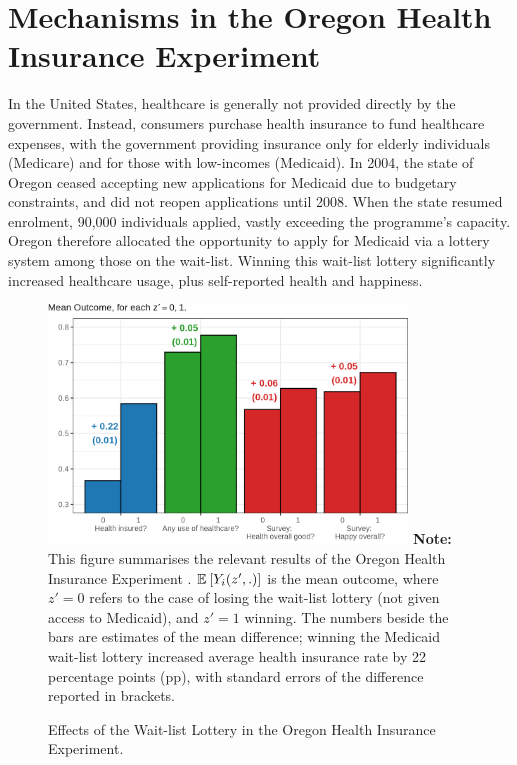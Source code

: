 \section{Mechanisms in the Oregon Health Insurance Experiment}
\label{sec:lottery}
In the United States, healthcare is generally not provided directly by the government.
Instead, consumers purchase health insurance to fund healthcare expenses, with the government providing insurance only for elderly individuals (Medicare) and for those with low-incomes (Medicaid).
In 2004, the state of Oregon ceased accepting new applications for Medicaid due to budgetary constraints, and did not reopen applications until 2008.
When the state resumed enrolment, 90,000 individuals applied, vastly exceeding the programme's capacity.
Oregon therefore allocated the opportunity to apply for Medicaid via a lottery system among those on the wait-list.
Winning this wait-list lottery significantly increased healthcare usage, plus self-reported health and happiness.

\begin{figure}[!htbp]
    \caption{Effects of the Wait-list Lottery in the Oregon Health Insurance Experiment.}
    \centering
    \includegraphics[width=0.85\textwidth]{sections/figures/insurance-effects.png}
    \label{fig:healthinsurance-effects}
    \justify
    \footnotesize    
    \textbf{Note:}
    This figure summarises the relevant results of the Oregon Health Insurance Experiment \citep{finkelstein2008oregon}.
    $\mathbb{E}_{} \left[ Y_i(z',.) \right]$ is the mean outcome, where $z' = 0$ refers to the case of losing the wait-list lottery (not given access to Medicaid), and $z' = 1$ winning.
    The numbers beside the bars are estimates of the mean difference; winning the Medicaid wait-list lottery increased average health insurance rate by 22 percentage points (pp), with standard errors of the difference reported in brackets.
\end{figure}

